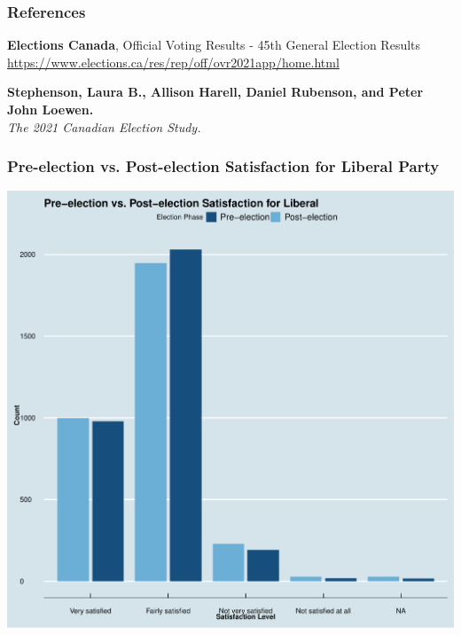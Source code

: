 \documentclass{beamer}
\begin{document}
\begin{frame}
    \frametitle{References} %

    \begin{flushleft}
        \textbf{Elections Canada}, Official Voting Results - 45th General Election Results\\
        \url{https://www.elections.ca/res/rep/off/ovr2021app/home.html}
        
        \vspace{1.0cm} %

        \textbf{Stephenson, Laura B., Allison Harell, Daniel Rubenson, and Peter John Loewen.}\\
        \textit{The 2021 Canadian Election Study.}
    \end{flushleft}

\end{frame}


\begin{frame}
    \frametitle{Pre-election vs. Post-election Satisfaction for Liberal Party}
    \begin{center}
        \includegraphics[scale=0.3]{Pre-election vs. Post-election Satisfaction for Liberal.pdf}
    \end{center}
\end{frame}
\end{document}
